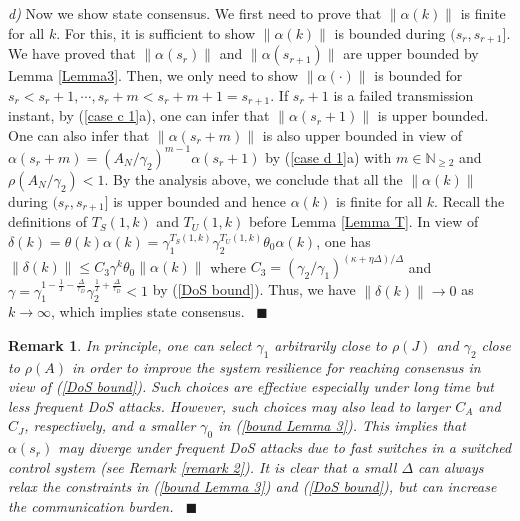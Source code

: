 \documentclass[letterpaper,journal,final,twocolumn]{IEEEtran}
\def\qedp{\hspace*{\fill}~{\tiny $\blacksquare$}}
\newtheorem{itremark}{Remark}
\newenvironment{remark}{\begin{itremark}\rm}{\end{itremark}}
\begin{document}
 \emph{d)}
 Now we show state consensus. We first need to prove that $\|\alpha(k)\|$ is finite for all $k$. For this, it is sufficient to show $\|\alpha(k)\|$ is bounded during $(s_r, s_{r+1}]$. We have proved that $\|\alpha(s_r)\|$ and $\|\alpha(s_{r+1})\|$ are upper bounded by Lemma \ref{Lemma3}. Then, we only need to show $\|\alpha(\cdot)\|$ is bounded for $s_r<s_r+1, \cdots, s_r+m<s_r+m+1=s_{r+1}$. If $s_r +1$ is a failed transmission instant, by (\ref{case c 1}a), one can infer that $\|\alpha(s_r + 1)\|$ is upper bounded. One can also infer that $\|\alpha (s_r + m )\|$ is also upper bounded in view of $\alpha(s_r + m ) = (A_N/\gamma_2)^{m-1} \alpha(s_r +1)$ by (\ref{case d 1}a) with $m\in \mathbb N_{\ge 2}$ and $\rho(A_N/\gamma_2)<1$. By the analysis above, we conclude that all the $\|\alpha(k)\|$ during $(s_r, s_{r+1}]$ is upper bounded and hence $\alpha(k)$ is finite for all $k$. 
 Recall the definitions of $T_S(1, k)$ and $T_U(1, k)$ before Lemma \ref{Lemma T}. In view of $\delta(k) = \theta(k) \alpha(k)  = \gamma_1 ^ {T_S(1,k)} \gamma_2 ^{T_U(1,k)}  \theta_0 \alpha(k) $, one has
$
 	\|\delta(k)\| \le  C_3  \gamma^k  \theta_0 \|\alpha(k)\| 
$
 where $C_3 = \left( \gamma_2 /\gamma_1   \right)^{(\kappa+\eta\Delta)/\Delta} $ and 
$
 	\gamma = \gamma_1^{1-\frac{1}{T}-\frac{\Delta}{\tau_D}  } \gamma_2^{ \frac{1}{T}+ \frac{\Delta}{\tau_D}   } < 1
$
 by (\ref{DoS bound}). Thus, we have $\|\delta(k)\|  \to 0$ as $k\to \infty$, which implies state consensus. 
 \qedp
 
 
 \color{black}
 
 
 



\begin{remark}
In principle, one can select $\gamma_1$ arbitrarily close to $\rho(J)$ and $\gamma_2$ close to $\rho(A)$ in order to improve the system resilience for reaching consensus in view of (\ref{DoS bound}). Such choices are effective especially under long time but less frequent DoS attacks. However, such choices may also lead to larger $C_A$ and $C_J$, respectively, and a smaller $\gamma_{0}$ in (\ref{bound Lemma 3}). This implies that $\alpha(s_r)$ may diverge under frequent DoS attacks due to fast switches in a switched control system (see Remark \ref{remark 2}). It is clear that a small $\Delta$ can always relax the constraints in (\ref{bound Lemma 3}) and (\ref{DoS bound}), but can increase the communication burden.      \qedp
\end{remark}
\end{document}
